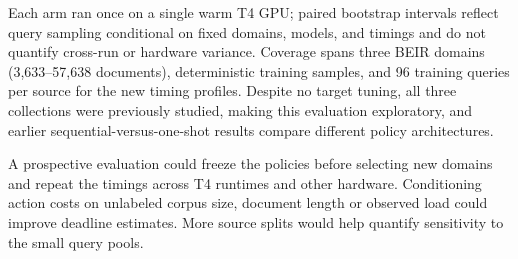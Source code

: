 Each arm ran once on a single warm T4 GPU; paired bootstrap intervals reflect query sampling conditional on fixed domains, models, and timings and do not quantify cross-run or hardware variance. Coverage spans three BEIR domains (3,633--57,638 documents), deterministic training samples, and 96 training queries per source for the new timing profiles. Despite no target tuning, all three collections were previously studied, making this evaluation exploratory, and earlier sequential-versus-one-shot results compare different policy architectures.

A prospective evaluation could freeze the policies before selecting new domains and repeat the timings across T4 runtimes and other hardware. Conditioning action costs on unlabeled corpus size, document length or observed load could improve deadline estimates. More source splits would help quantify sensitivity to the small query pools.
